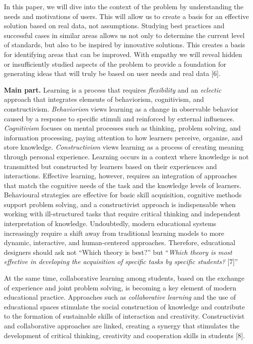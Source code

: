 In this paper, we will dive into the context of the problem by
understanding the needs and motivations of users. This will allow us to
create a basis for an effective solution based on real data, not
assumptions. Studying best practices and successful cases in similar
areas allows us not only to determine the current level of standards,
but also to be inspired by innovative solutions. This creates a basis
for identifying areas that can be improved. With empathy we will reveal
hidden or insufficiently studied aspects of the problem to provide a
foundation for generating ideas that will truly be based on user needs
and real data {[}6{]}.

{\bfseries Main part.} Learning is a process that requires
\emph{flexibility} and an \emph{eclectic} approach that integrates
elements of behaviorism, cognitivism, and constructivism.
\emph{Behaviorism} views learning as a change in observable behavior
caused by a response to specific stimuli and reinforced by external
influences. \emph{Cognitivism} focuses on mental processes such as
thinking, problem solving, and information processing, paying attention
to how learners perceive, organize, and store knowledge.
\emph{Constructivism} views learning as a process of creating meaning
through personal experience. Learning occurs in a context where
knowledge is not transmitted but constructed by learners based on their
experiences and interactions. Effective learning, however, requires an
integration of approaches that match the cognitive needs of the task and
the knowledge levels of learners. Behavioural strategies are effective
for basic skill acquisition, cognitive methods support problem solving,
and a constructivist approach is indispensable when working with
ill-structured tasks that require critical thinking and independent
interpretation of knowledge. Undoubtedly, modern educational systems
increasingly require a shift away from traditional learning models to
more dynamic, interactive, and human-centered approaches. Therefore,
educational designers should ask not ``Which theory is best?'' but
``\emph{Which theory is most effective in developing the acquisition of
specific tasks by specific students?} {[}7{]}''

At the same time, collaborative learning among students, based on the
exchange of experience and joint problem solving, is becoming a key
element of modern educational practice. Approaches such as
\emph{collaborative learning} and the use of educational spaces
stimulate the social construction of knowledge and contribute to the
formation of sustainable skills of interaction and creativity.
Constructivist and collaborative approaches are linked, creating a
synergy that stimulates the development of critical thinking, creativity
and cooperation skills in students {[}8{]}.

